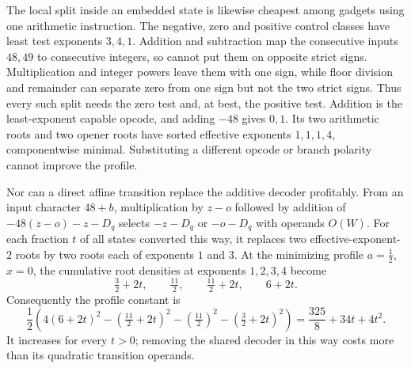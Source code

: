 \documentclass[11pt]{article}
\theoremstyle{remark}
\begin{document}
The local split inside an embedded state is likewise cheapest among gadgets
using one arithmetic instruction.  The negative, zero and positive control
classes have least test exponents $3,4,1$.  Addition and subtraction map the
consecutive inputs $48,49$ to consecutive integers, so cannot put them on
opposite strict signs.  Multiplication and integer powers leave them with one
sign, while floor division and remainder can separate zero from one sign but
not the two strict signs.  Thus every such split needs the zero test and, at
best, the positive test.  Addition is the least-exponent capable opcode, and
adding $-48$ gives $0,1$.  Its two arithmetic roots and two opener roots have
sorted effective exponents $1,1,1,4$, componentwise minimal.  Substituting a
different opcode or branch polarity cannot improve the profile.

Nor can a direct affine transition replace the additive decoder profitably.
From an input character $48+b$, multiplication by $z-o$ followed by addition
of $-48(z-o)-z-D_q$ selects $-z-D_q$ or $-o-D_q$ with operands $O(W)$.
For each fraction $t$ of all states converted this way, it replaces two
effective-exponent-$2$ roots by two roots each of exponents $1$ and $3$.
At the minimizing profile $a=\frac12$, $x=0$, the cumulative root densities
at exponents $1,2,3,4$ become
\[
 \tfrac32+2t,\qquad \tfrac{11}2,\qquad \tfrac{11}2+2t,
 \qquad 6+2t.
\]
Consequently the profile constant is
\[
 \frac12\left(4(6+2t)^2-(\tfrac{11}2+2t)^2
 -(\tfrac{11}2)^2-(\tfrac32+2t)^2\right)
 =\frac{325}8+34t+4t^2.
\]
It increases for every $t>0$; removing the shared decoder in this way costs
more than its quadratic transition operands.
\end{document}
